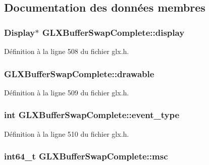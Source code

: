 \subsection{Documentation des données membres}
\hypertarget{struct_g_l_x_buffer_swap_complete_ad5ab9343db33df2e2abe97999d00e678}{
\subsubsection[{display}]{\setlength{\rightskip}{0pt plus 5cm}Display$\ast$ G\-L\-X\-Buffer\-Swap\-Complete\-::display}}\label{struct_g_l_x_buffer_swap_complete_ad5ab9343db33df2e2abe97999d00e678}


Définition à la ligne 508 du fichier glx.\-h.

\hypertarget{struct_g_l_x_buffer_swap_complete_a926866fb73d150fd7bfe85154855e97b}{
\subsubsection[{drawable}]{ G\-L\-X\-Buffer\-Swap\-Complete\-::drawable}}\label{struct_g_l_x_buffer_swap_complete_a926866fb73d150fd7bfe85154855e97b}


Définition à la ligne 509 du fichier glx.\-h.

\hypertarget{struct_g_l_x_buffer_swap_complete_a39b8f393f8eaa54db030751edac25d7d}{
\subsubsection[{event\-\_\-type}]{\setlength{\rightskip}{0pt plus 5cm}int G\-L\-X\-Buffer\-Swap\-Complete\-::event\-\_\-type}}\label{struct_g_l_x_buffer_swap_complete_a39b8f393f8eaa54db030751edac25d7d}


Définition à la ligne 510 du fichier glx.\-h.

\hypertarget{struct_g_l_x_buffer_swap_complete_ad856b4068246e7a96ca26a938929ca15}{
\subsubsection[{msc}]{\setlength{\rightskip}{0pt plus 5cm}int64\-\_\-t G\-L\-X\-Buffer\-Swap\-Complete\-::msc}}\label{struct_g_l_x_buffer_swap_complete_ad856b4068246e7a96ca26a938929ca15}


